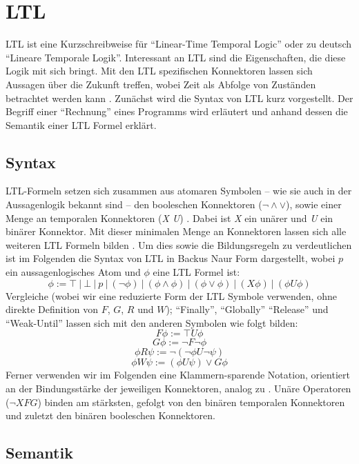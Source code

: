 \section{LTL}

LTL ist eine Kurzschreibweise für "`Linear-Time Temporal Logic"' oder zu deutsch "`Lineare Temporale Logik"'. Interessant an LTL sind die Eigenschaften, die diese Logik mit sich bringt. Mit den LTL spezifischen Konnektoren lassen sich Aussagen über die Zukunft treffen, wobei Zeit als Abfolge von Zuständen betrachtet werden kann \cite{huth+04}. Zunächst wird die Syntax von LTL kurz vorgestellt. Der Begriff einer "`Rechnung"' eines Programms wird erläutert und anhand dessen die Semantik einer LTL Formel erklärt.

\subsection{Syntax}

LTL-Formeln setzen sich zusammen aus atomaren Symbolen -- wie sie auch in der Aussagenlogik bekannt sind -- den booleschen Konnektoren ($\lnot \land \lor$), sowie einer Menge an temporalen Konnektoren (\textit{X U}) \cite{huth+04,vardi+96}. Dabei ist \textit{X} ein unärer und \textit{U} ein binärer Konnektor. Mit dieser minimalen Menge an Konnektoren lassen sich alle weiteren LTL Formeln bilden \cite{vardi+96}.
Um dies sowie die Bildungsregeln zu verdeutlichen ist im Folgenden die Syntax von LTL in Backus Naur Form dargestellt, wobei $p$ ein aussagenlogisches Atom und $\phi$ eine LTL Formel ist:
\[
    \phi := \top\ |\ \bot\ |\ p\ |\ (\lnot\phi)\ |\ (\phi \land \phi)\ |\ (\phi \lor \phi)\ |\ (X\phi)\ |\ (\phi U\phi)
\]
Vergleiche \cite{huth+04} (wobei wir eine reduzierte Form der LTL Symbole verwenden, ohne direkte Definition von $F$, $G$, $R$ und $W$); "`Finally"', "`Globally"' "`Release"' und "`Weak-Until"' lassen sich mit den anderen Symbolen wie folgt bilden:
\[
    F\phi := \top U\phi
\]
\[
    G\phi := \lnot F\lnot\phi
\]
\[
    \phi R\psi := \lnot(\lnot\phi U\lnot\psi)
\]
\[
    \phi W\psi := (\phi U\psi) \lor G\phi
\]
Ferner verwenden wir im Folgenden eine Klammern-sparende Notation, orientiert an der Bindungsstärke der jeweiligen Konnektoren, analog zu \cite{huth+04}. Unäre Operatoren ($\lnot X F G$) binden am stärksten, gefolgt von den binären temporalen Konnektoren und zuletzt den binären booleschen Konnektoren.


\subsection{Semantik}


